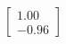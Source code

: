 \documentclass[preview]{standalone}
\begin{document}
\begin{align*}
\begin{bmatrix} 1.00 \\ -0.96 \end{bmatrix}
\end{align*}
\end{document}
